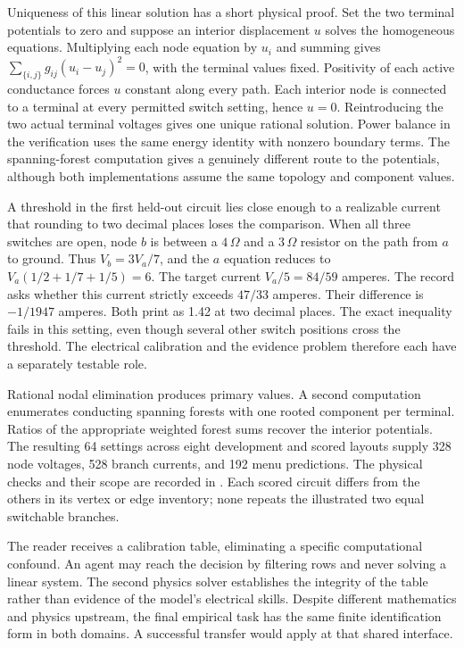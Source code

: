 \documentclass[12pt,letterpaper]{article}
\newcommand{\code}[1]{\texttt{\detokenize{#1}}}
\begin{document}
Uniqueness of this linear solution has a short physical proof. Set the two terminal potentials to zero and suppose an interior displacement $u$ solves the homogeneous equations. Multiplying each node equation by $u_i$ and summing gives $\sum_{\{i,j\}}g_{ij}(u_i-u_j)^2=0$, with the terminal values fixed. Positivity of each active conductance forces $u$ constant along every path. Each interior node is connected to a terminal at every permitted switch setting, hence $u=0$. Reintroducing the two actual terminal voltages gives one unique rational solution. Power balance in the verification uses the same energy identity with nonzero boundary terms. The spanning-forest computation gives a genuinely different route to the potentials, although both implementations assume the same topology and component values.

A threshold in the first held-out circuit lies close enough to a realizable current that rounding to two decimal places loses the comparison. When all three switches are open, node $b$ is between a $4\,\Omega$ and a $3\,\Omega$ resistor on the path from $a$ to ground. Thus $V_b=3V_a/7$, and the $a$ equation reduces to $V_a(1/2+1/7+1/5)=6$. The target current $V_a/5=84/59$ amperes. The record asks whether this current strictly exceeds $47/33$ amperes. Their difference is $-1/1947$ amperes. Both print as 1.42 at two decimal places. The exact inequality fails in this setting, even though several other switch positions cross the threshold. The electrical calibration and the evidence problem therefore each have a separately testable role.

Rational nodal elimination produces primary values. A second computation enumerates conducting spanning forests with one rooted component per terminal. Ratios of the appropriate weighted forest sums recover the interior potentials. The resulting 64 settings across eight development and scored layouts supply 328 node voltages, 528 branch currents, and 192 menu predictions. The physical checks and their scope are recorded in \code{circuits/verification.json}. Each scored circuit differs from the others in its vertex or edge inventory; none repeats the illustrated two equal switchable branches.

The reader receives a calibration table, eliminating a specific computational confound. An agent may reach the decision by filtering rows and never solving a linear system. The second physics solver establishes the integrity of the table rather than evidence of the model's electrical skills. Despite different mathematics and physics upstream, the final empirical task has the same finite identification form in both domains. A successful transfer would apply at that shared interface.
\end{document}

